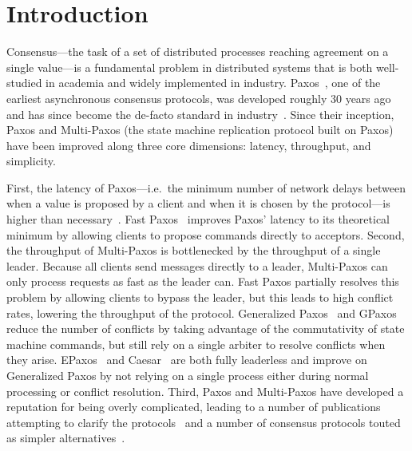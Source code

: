 \section{Introduction}
Consensus---the task of a set of distributed processes reaching agreement on a
single value---is a fundamental problem in distributed systems that is both
well-studied in academia and widely implemented in industry.
Paxos~\cite{lamport1998part}, one of the earliest asynchronous consensus
protocols, was developed roughly 30 years ago and has since become the de-facto
standard in industry~\cite{burrows2006chubby, chandra2007paxos,
baker2011megastore, corbett2013spanner}. Since their inception, Paxos and
Multi-Paxos (the state machine replication protocol built on Paxos) have been
improved along three core dimensions: latency, throughput, and simplicity.

First, the latency of Paxos---i.e.\ the minimum number of network delays
between when a value is proposed by a client and when it is chosen by the
protocol---is higher than necessary~\cite{lamport2006lower}. Fast
Paxos~\cite{lamport2006fast} improves Paxos' latency to its theoretical minimum
by allowing clients to propose commands directly to acceptors.
%
Second, the throughput of Multi-Paxos is bottlenecked by the throughput of a
single leader. Because all clients send messages directly to a leader,
Multi-Paxos can only process requests as fast as the leader can. Fast Paxos
partially resolves this problem by allowing clients to bypass the leader, but
this leads to high conflict rates, lowering the throughput of the protocol.
Generalized Paxos~\cite{lamport2005generalized} and GPaxos~\cite{sutra2011fast}
reduce the number of conflicts by taking advantage of the commutativity of
state machine commands, but still rely on a single arbiter to resolve conflicts
when they arise. EPaxos~\cite{moraru2013there, moraru2013proof} and
Caesar~\cite{arun2017speeding} are both fully leaderless and improve on
Generalized Paxos by not relying on a single process either during normal
processing or conflict resolution.
%
Third, Paxos and Multi-Paxos have developed a reputation for being overly
complicated, leading to a number of publications attempting to clarify the
protocols~\cite{lamport2001paxos, lampson2001abcd, mazieres2007paxos,
van2015paxos} and a number of consensus protocols touted as simpler
alternatives~\cite{ongaro2014search, rystsov2018caspaxos}.

